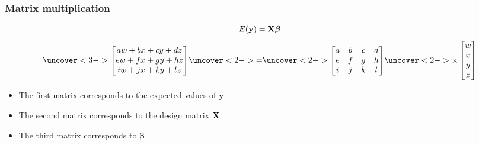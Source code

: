 \documentclass[color=usenames,dvipsnames]{beamer}\usepackage[]{graphicx}\usepackage[]{color}
\begin{document}
\begin{frame}
  \frametitle{Matrix multiplication}
  \Large
  \begin{center}
    \[
      {E}({\bf y}) = {\bf X}{\bm \beta}
    \]
    \[
    \uncover<3->{
    \begin{bmatrix}
      aw + bx + cy + dz \\
      ew + fx + gy + hz \\
      iw + jx + ky + lz %
    \end{bmatrix}
    }
    \uncover<2->{=}
    \uncover<2->{
    \begin{bmatrix}
      a & b & c & d \\
      e & f & g & h \\
      i & j & k & l %
    \end{bmatrix}
    }
    \uncover<2->{
    \times
    \begin{bmatrix}
      w \\
      x \\
      y \\
      z
    \end{bmatrix}
    }
    \]
  \end{center}
  \normalsize
    \begin{itemize}
      \item<4-> The first matrix corresponds to the expected values of $\bm y$
      \item<4-> The second matrix corresponds to the design matrix {$\bf X$}
      \item<4-> The third matrix corresponds to {$\bm \beta$}
    \end{itemize}
\end{frame}
\end{document}
